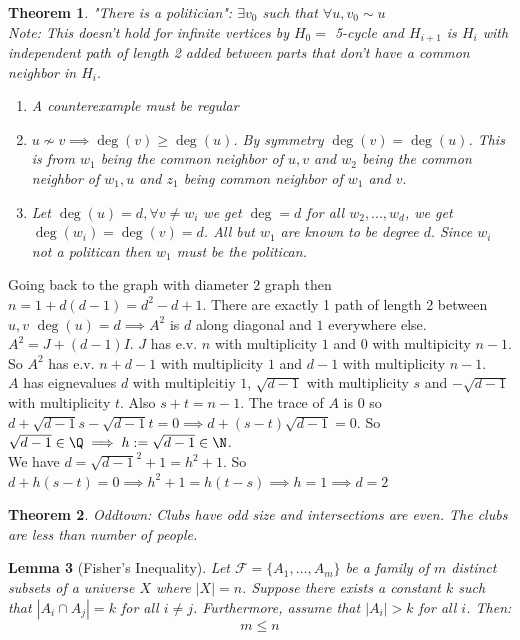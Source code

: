 \documentclass[a4paper]{article}
\newtheorem{thm}{Theorem}[section]
\newtheorem{lem}[thm]{Lemma}
\begin{document}
\begin{thm}
    "There is a politician": $\exists v_0$ such that $\forall u, v_0\sim u$\\
    Note: This doesn't hold for infinite vertices by $H_0=$ 5-cycle and $H_{i+1}$ is $H_i$ with independent path of length 2 added between parts that don't have a common neighbor in $H_i.$\\
    \begin{enumerate}
        \item[Step 1] A counterexample must be regular 
        \item[Step 1A] $u\not \sim v\implies \deg(v)\geq \deg(u)$. By symmetry $\deg(v)=\deg(u)$. This is from $w_1$ being the common neighbor of $u,v$ and $w_2$ being the common neighbor of $w_1,u$ and $z_{1}$ being common neighbor of $w_1$ and $v.$
        \item[Step 1B] Let $\deg(u)=d, \forall v\not= w_i$ we get $\deg=d$ for all $w_2,...,w_d$, we get $\deg(w_i)=\deg(v)=d$. All but $w_1$ are known to be degree $d.$ Since $w_i$ not a politican then $w_1$ must be the politican.
    \end{enumerate}
\end{thm}
\noindent Going back to the graph with diameter $2$ graph then $n=1+d(d-1)=d^2-d+1$. There are exactly 1 path of length 2 between $u,v$ $\deg(u)=d\implies A^2$ is $d$ along diagonal and $1$ everywhere else. $A^2=J+(d-1)I$. $J$ has e.v. $n$ with multiplicity $1$ and $0$ with multipicity $n-1.$ So $A^2$ has e.v. $n+d-1$ with multiplicity $1$ and $d-1$ with multiplicity $n-1.$\\
$A$ has eignevalues $d$ with multiplcitiy $1$, $\sqrt{d-1}$ with multiplicity $s$ and $-\sqrt{d-1}$ with multiplicity $t.$ Also $s+t=n-1.$
The trace of $A$ is $0$ so $d+\sqrt{d-1}s-\sqrt{d-1}t=0\implies d+(s-t)\sqrt{d-1}=0.$ So $\sqrt{d-1}\in \Q\implies h:=\sqrt{d-1}\in \N$. \\
We have $d=\sqrt{d-1}^2+1=h^2+1$. So $d+h(s-t)=0\implies h^2+1=h(t-s)\implies h=1\implies d=2$
\begin{thm}
    Oddtown: Clubs have odd size and intersections are even. The clubs are less than number of people.
\end{thm}
\begin{lem}[Fisher's Inequality]
Let $\mathcal{F} = \{A_1, \dots, A_m\}$ be a family of $m$ distinct subsets of a universe $X$ where $|X| = n$. Suppose there exists a constant $k$ such that $|A_i \cap A_j| = k$ for all $i \neq j$. Furthermore, assume that $|A_i| > k$ for all $i$. Then:
\[
    m \leq n
\]
\end{lem}
\end{document}
